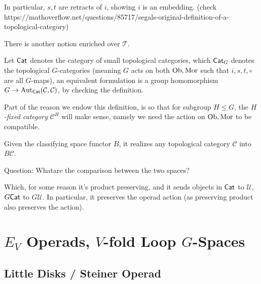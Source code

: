 \documentclass{article}
\begin{document}
In particular, $s,t$ are retracts of $i$, showing $i$ is an embedding. (check https://mathoverflow.net/questions/85717/segals-original-definition-of-a-topological-category)

There is another notion enriched over $\mathcal{T}$.

\begin{notn}
    Let $\mathsf{Cat}$ denotes the category of small topological categories, which $\mathsf{Cat}_G$ denotes the topological $G$-categories (meaning $G$ acts on both $\mathrm{Ob},\mathrm{Mor}$ such that $i,s,t,\circ$ are all $G$-maps), an equivalent formulation is a group homomorphism $G\rightarrow \mathrm{Aut}_{\mathsf{Cat}}(\mathcal{C},\mathcal{C})$, by checking the definition.
\end{notn}

Part of the reason we endow this definition, is so that for subgroup $H\leq G$, the \emph{$H$-fixed category} $\mathcal{C}^H$ will make sense, namely we need the action on $\mathrm{Ob},\mathrm{Mor}$ to be compatible.

\begin{rem}
    Given the classifying space functor $B$, it realizes any topological category $\mathcal{C}$ into $B\mathcal{C}$. 

    Question: Whatare the comparison between the two spaces?
\end{rem}

Which, for some reason it's product preserving, and it sends objects in $\mathsf{Cat}$ to $\mathcal{U}$, $G\mathsf{Cat}$ to $G\mathcal{U}$. In particular, it preserves the operad action (as preserving product also preserves the action).

\newpage

\section{$E_V$ Operads, $V$-fold Loop $G$-Spaces}

\subsection{Little Disks / Steiner Operad}
\end{document}
